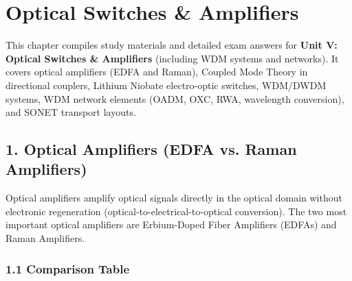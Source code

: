 \chapter{Optical Switches \& Amplifiers}

This chapter compiles study materials and detailed exam answers for \textbf{Unit V: Optical Switches \& Amplifiers} (including WDM systems and networks). It covers optical amplifiers (EDFA and Raman), Coupled Mode Theory in directional couplers, Lithium Niobate electro-optic switches, WDM/DWDM systems, WDM network elements (OADM, OXC, RWA, wavelength conversion), and SONET transport layouts.


\section{1. Optical Amplifiers (EDFA vs. Raman Amplifiers)}

Optical amplifiers amplify optical signals directly in the optical domain without electronic regeneration (optical-to-electrical-to-optical conversion). The two most important optical amplifiers are Erbium-Doped Fiber Amplifiers (EDFAs) and Raman Amplifiers.

\subsection{1.1 Comparison Table}

